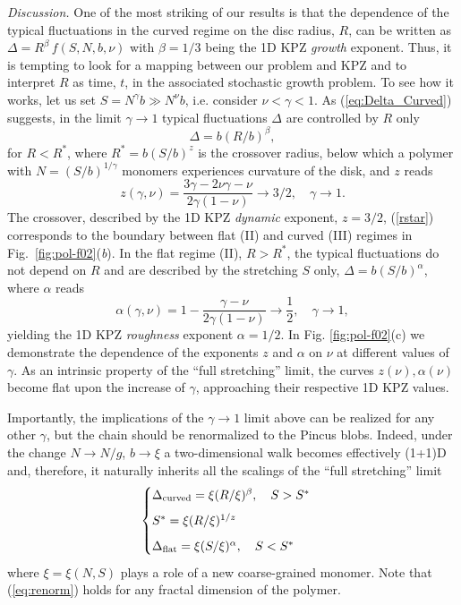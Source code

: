 \documentclass[aps,pre,floatfix,twocolumn,nofootinbib]{revtex4-2}
\newcommand{\be}{\begin{equation}}
\newcommand{\ee}{\end{equation}}
\newcommand{\eq}[1]{(\ref{#1})}
\newcommand{\fig}[1]{Fig.~\ref{#1}}
\begin{document}
\textit{Discussion.} One of the most striking of our results is that the dependence of the typical fluctuations in the curved regime on the disc radius, $R$, can be written as $\Delta = R^{\beta}\, f(S,N,b,\nu)$ with $\beta=1/3$ being the 1D KPZ \textit{growth} exponent. Thus, it is tempting to look for a mapping between our problem and KPZ and to interpret $R$ as time, $t$, in the associated stochastic growth problem. To see how it works, let us set $S = N^{\gamma} b \gg N^{\nu} b$, i.e. consider $\nu < \gamma < 1$. As \eq{eq:Delta_Curved} suggests, in the limit $\gamma \to 1$ typical fluctuations $\Delta$ are controlled by $R$ only
\be
\Delta = b(R/b)^{\beta},
\ee
for $R < R^*$, where $R^* = b(S/b)^z$ is the crossover radius, below which a polymer with $N=(S/b)^{1/\gamma}$ monomers experiences curvature of the disk, and $z$ reads
\be
z(\gamma, \nu)= \frac{3\gamma-2\nu \gamma-\nu}{2\gamma(1-\nu)} \to 3/2, \quad \gamma \to 1.
\label{rstar}
\ee
The crossover, described by the 1D KPZ \textit{dynamic} exponent, $z=3/2$, \eq{rstar} corresponds to the boundary between flat (II) and curved (III) regimes in \fig{fig:pol-f02}(\textit{b}). In the flat regime (II), $R>R^{\ast}$, the typical fluctuations do not depend on $R$ and are described by the stretching $S$ only, $\Delta = b(S/b)^{\alpha}$, where $\alpha$ reads
\be
\alpha(\gamma, \nu) = 1 - \frac{\gamma-\nu}{2\gamma(1-\nu)} \to \frac{1}{2}, \quad \gamma \to 1,
\ee
yielding the 1D KPZ \textit{roughness} exponent $\alpha=1/2$. In Fig. \ref{fig:pol-f02}(c) we demonstrate the dependence of the exponents $z$ and $\alpha$ on $\nu$ at different values of $\gamma$. As an intrinsic property of the ``full stretching'' limit, the curves $z(\nu), \alpha(\nu)$ become flat upon the increase of $\gamma$, approaching their respective 1D KPZ values.

Importantly, the implications of the $\gamma \to 1$ limit above can be realized for any other $\gamma$, but the chain should be renormalized to the Pincus blobs. Indeed, under the change $N \to N/g$, $b \to \xi$ a two-dimensional walk becomes effectively (1+1)D and, therefore, it naturally inherits all the scalings of the ``full stretching'' limit
\be
\begin{cases}
\Delta_{\mathrm{curved}} = \xi (R/\xi)^{\beta}, \quad S>S^* \medskip \\
S^* = \xi (R/\xi)^{1/z} \medskip \\
\Delta_{\mathrm{flat}} = \xi (S/\xi)^{\alpha}, \quad S<S^*
\end{cases}
\label{eq:renorm}
\ee
where $\xi = \xi(N,S)$ plays a role of a new coarse-grained monomer.  Note that \eq{eq:renorm} holds for any fractal dimension of the polymer.
\end{document}
